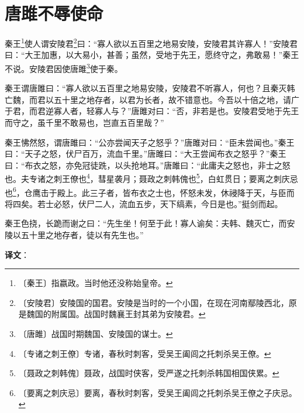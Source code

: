 \documentclass[12pt,UTF-8,openany]{ctexbook}
\begin{document}
\chapter{唐雎不辱使命}

\begin{normalsize}
    
    秦王\footnote{〔秦王〕指嬴政。当时他还没称始皇帝。}使人谓安陵君\footnote{〔安陵君〕安陵国的国君。安陵是当时的一个小国，在现在河南鄢陵西北，原是魏国的附属国。战国时魏襄王封其弟为安陵君。}曰：“寡人欲以五百里之地易安陵，安陵君其许寡人！”安陵君曰：“大王加惠，以大易小，甚善；虽然，受地于先王，愿终守之，弗敢易！”秦王不说。安陵君因使唐雎\footnote{〔唐雎〕战国时期魏国、安陵国的谋士。}使于秦。
    
    秦王谓唐雎曰：“寡人欲以五百里之地易安陵，安陵君不听寡人，何也？且秦灭韩亡魏，而君以五十里之地存者，以君为长者，故不错意也。今吾以十倍之地，请广于君，而君逆寡人者，轻寡人与？”唐雎对曰：“否，非若是也。安陵君受地于先王而守之，虽千里不敢易也，岂直五百里哉？”
    
    秦王怫然怒，谓唐雎曰：“公亦尝闻天子之怒乎？”唐雎对曰：“臣未尝闻也。”秦王曰：“天子之怒，伏尸百万，流血千里。”唐雎曰：“大王尝闻布衣之怒乎？”秦王曰：“布衣之怒，亦免冠徒跣，以头抢地耳。”唐雎曰：“此庸夫之怒也，非士之怒也。夫专诸之刺王僚也\footnote{〔专诸之刺王僚〕专诸，春秋时刺客，受吴王阖闾之托刺杀吴王僚。}，彗星袭月；聂政之刺韩傀也\footnote{〔聂政之刺韩傀〕聂政，战国时侠客，受严遂之托刺杀韩国相国侠累。}，白虹贯日；要离之刺庆忌也\footnote{〔要离之刺庆忌〕要离，春秋时刺客，受吴王阖闾之托刺杀吴王僚之子庆忌。}，仓鹰击于殿上。此三子者，皆布衣之士也，怀怒未发，休祲降于天，与臣而将四矣。若士必怒，伏尸二人，流血五步，天下缟素，今日是也。”挺剑而起。
    
    秦王色挠，长跪而谢之曰：“先生坐！何至于此！寡人谕矣：夫韩、魏灭亡，而安陵以五十里之地存者，徒以有先生也。”
\end{normalsize}


\newpage

\textbf{译文}：

\vspace{1em}
\end{document}
